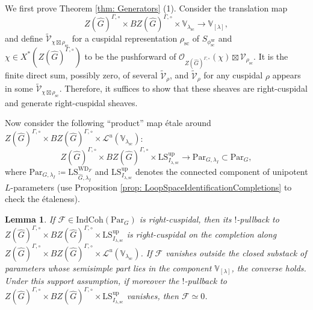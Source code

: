 \documentclass{amsart}
\newtheorem{lemma}[theorem]{Lemma}
\theoremstyle{definition}
\theoremstyle{remark}
\numberwithin{equation}{section}
\newcommand{\mc}{\mathcal}
\newcommand{\Sc}{\mathrm{sc}}
\newcommand{\wh}{\widehat}
\newcommand{\Par}{\mathrm{Par}}
\newcommand{\IndCoh}{\mathrm{IndCoh}}
\newcommand{\ur}{\mathrm{ur}}
\newcommand{\V}{\mathbb{V}}
\newcommand{\up}{\mathrm{up}}
\newcommand{\WD}{\mathrm{WD}}
\newcommand{\LS}{\mathrm{LS}}
\begin{document}
We first prove Theorem \ref{thm: Generators} (1). Consider the translation map
\[
Z(\wh G)^{\Gamma, \circ}\times BZ(\wh G)^{\Gamma, \circ} \times \V_{\lambda_\Sc}  \to \V_{[\lambda]}, 
\]
and define $\widetilde{\mc V}_{\chi\boxtimes \rho_\Sc}$ for a cuspidal representation $\rho_\Sc$ of $S_{\phi^\ur_\Sc}$ and $\chi\in X^*(Z(\wh G)^{\Gamma,\circ})$ to be the pushforward of $\mc O_{Z(\wh G)^{\Gamma, \circ}}(\chi)\boxtimes \mc V_{\rho_\Sc}$. It is the finite direct sum, possibly zero, of several $\widetilde{\mc V}_{\rho}$, and $\widetilde{\mc V}_{\rho}$ for any cuspidal $\rho$ appears in some $\widetilde{\mc V}_{\chi\boxtimes\rho_\Sc}$. Therefore, it suffices to show that these sheaves are right-cuspidal and generate right-cuspidal sheaves. 

Now consider the following ``product'' map \'etale around $Z(\wh G)^{\Gamma, \circ}\times BZ(\wh G)^{\Gamma, \circ}\times \mc L^u(\V_{\lambda_\Sc})$:
\[
Z(\wh G)^{\Gamma, \circ}\times BZ(\wh G)^{\Gamma, \circ} \times \LS_{I_{\lambda,\Sc}}^\up \to \Par_{G, \lambda_I}\subset \Par_G, 
\]
where $\Par_{G, \lambda_I}\coloneq \LS_{\wh G,\lambda_I}^{\WD_F}$ and  $\LS_{I_{\lambda,\Sc}}^\up$ denotes the connected component of unipotent $L$-parameters (use Proposition \ref{prop: LoopSpaceIdentificationCompletions} to check the \'etaleness). 

\begin{lemma}\label{lem: PassingToSimplyConnectedCover}
If $\mc F\in \IndCoh (\Par_G)$ is right-cuspidal, then its $!$-pullback to $Z(\wh G)^{\Gamma, \circ}\times BZ(\wh G)^{\Gamma, \circ}\times \LS_{I_{\lambda,\Sc}}^\up$ is right-cuspidal on the completion along $Z(\wh G)^{\Gamma, \circ}\times BZ(\wh G)^{\Gamma, \circ}\times \mc L^u(\V_{\lambda_\Sc})$. If $\mc F$ vanishes outside the closed substack of parameters whose semisimple part lies in the component $\V_{[\lambda]}$, the converse holds. Under this support assumption, if moreover the $!$-pullback to $Z(\wh G)^{\Gamma, \circ}\times BZ(\wh G)^{\Gamma, \circ}\times \LS_{I_{\lambda,\Sc}}^\up$ vanishes, then $\mc F\simeq  0$. 
\end{lemma}
\end{document}
